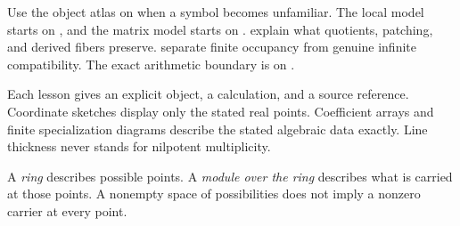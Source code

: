 Use the object atlas on  when a symbol becomes unfamiliar. The local model starts on , and the matrix model starts on .  explain what quotients, patching, and derived fibers preserve.  separate finite occupancy from genuine infinite compatibility. The exact arithmetic boundary is on .

Each lesson gives an explicit object, a calculation, and a source reference. Coordinate sketches display only the stated real points. Coefficient arrays and finite specialization diagrams describe the stated algebraic data exactly. Line thickness never stands for nilpotent multiplicity.


A \emph{ring} describes possible points. A \emph{module over the ring} describes what is carried at those points. A nonempty space of possibilities does not imply a nonzero carrier at every point.

